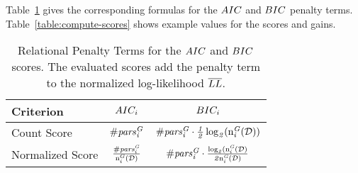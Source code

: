 \documentclass{article}
\begin{document}

Table~\ref{table:comparison-scores} gives the corresponding formulas for the $\aic$ and $\bic$  penalty terms. 
Table~\ref{table:compute-scores} shows example values for the scores and gains. 

\begin{table}[tb]
\begin{tabular}{| p{2.7cm} | c | c |}
	\hline Criterion & $\aic_{i}$ & $\bic_{i}$  \\
	\hline

Count Score 
& $ \numpars{G}{i}$
&$ \numpars{G}{i} \cdot \frac{1}{2}\log_2(\Fcount{G}{i}{\dstructure}) $

\\\hline
 Normalized Score  & 
$ \frac{\numpars{G}{i}}{\Fcount{G}{i}{\dstructure}}$ &
$  \numpars{G}{i} \cdot \frac{\log_2(\Fcount{G}{i}{\dstructure}}{2 \Fcount{G}{i}{\dstructure}}$ \\\hline
\end{tabular}
\caption{Relational Penalty Terms for the $\aic$ and $\bic$ scores. 
The evaluated scores add the penalty term to the normalized log-likelihood $\nscore{\loglikelihood}$.}
\label{table:comparison-scores}
\end{table}
\end{document}
